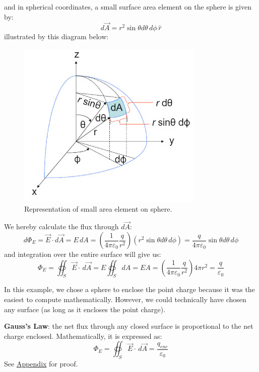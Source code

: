 \documentclass[11pt, letterpaper]{article}
\begin{document}
	and in spherical coordinates, a small surface area element on the sphere is given by:
	\[d\vec{A} = r^2\sin\theta d\theta\, d\phi\, \hat{r}\] illustrated by this diagram below:
	\begin{figure}[h!]
		\centering
		\includegraphics[scale=0.5]{sphere-dA}
		\caption{Representation of small area element on sphere.}
	\end{figure}
	
	We hereby calculate the flux through $d\vec{A}$: \[d\Phi_E=\vec{E}\cdot d\vec{A} = E\, dA
	= \left( \frac{1}{4\pi\varepsilon_0}\frac{q}{r^2}\right)(r^2\sin\theta d\theta\, d\phi) = 
	\frac{q}{4\pi\varepsilon_0}\sin\theta d\theta\, d\phi\] and integration over the entire surface
	will give us:\[\Phi_E = \oiint_S \vec{E}\cdot\, d\vec{A} = E\oiint_S dA = EA = \left( \frac{1}{4\pi
	\varepsilon_0}\frac{q}{r^2}\right)4\pi r^2 = \frac{q}{\varepsilon_0} \]
	
	In this example, we chose a sphere to enclose the point charge because it was the easiest
	to compute mathematically. However, we could technically have chosen any surface (as long
	as it encloses the point charge). 
	
	\textbf{Gauss's Law}:  the net flux through any closed surface is proportional to the net 
	charge enclosed. Mathematically, it is expressed as:
	\begin{equation}
		\boxed{\Phi_E = \oiint_S\vec{E}\cdot\, d\vec{A} = \frac{q_{enc}}{\varepsilon_0}}
	\end{equation}
	See \hyperlink{subsection.4.2}{Appendix} for proof.
	
\end{document}
